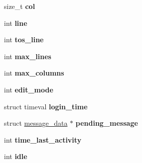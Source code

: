 \begin{DoxyCompactItemize}
\item 
\hypertarget{structdescriptor__data_aba74a84b3bad7387b9b5e3bf241ba015}{size\-\_\-t {\bfseries col}}\label{structdescriptor__data_aba74a84b3bad7387b9b5e3bf241ba015}

\item 
\hypertarget{structdescriptor__data_a1477839877221460a132848b7340f904}{int {\bfseries line}}\label{structdescriptor__data_a1477839877221460a132848b7340f904}

\item 
\hypertarget{structdescriptor__data_a5236d67527a8b6f1cf5fabb0760e3b20}{int {\bfseries tos\-\_\-line}}\label{structdescriptor__data_a5236d67527a8b6f1cf5fabb0760e3b20}

\item 
\hypertarget{structdescriptor__data_a12bdc9635fd09ce0906a28ad30a73e4d}{int {\bfseries max\-\_\-lines}}\label{structdescriptor__data_a12bdc9635fd09ce0906a28ad30a73e4d}

\item 
\hypertarget{structdescriptor__data_abe7ec1bc4431feea1e82b57a4ba7d73a}{int {\bfseries max\-\_\-columns}}\label{structdescriptor__data_abe7ec1bc4431feea1e82b57a4ba7d73a}

\item 
\hypertarget{structdescriptor__data_ac1375013e49baf64fd248f5b23f37c8a}{int {\bfseries edit\-\_\-mode}}\label{structdescriptor__data_ac1375013e49baf64fd248f5b23f37c8a}

\item 
\hypertarget{structdescriptor__data_a3dddb74c4d4bc188ad4994a4e8027d31}{struct timeval {\bfseries login\-\_\-time}}\label{structdescriptor__data_a3dddb74c4d4bc188ad4994a4e8027d31}

\item 
\hypertarget{structdescriptor__data_a8de6ed1bad23a2b053cd6c81e6e2d1aa}{struct \hyperlink{structmessage__data}{message\-\_\-data} $\ast$ {\bfseries pending\-\_\-message}}\label{structdescriptor__data_a8de6ed1bad23a2b053cd6c81e6e2d1aa}

\item 
\hypertarget{structdescriptor__data_a8bea3958920a5f23b527e10cc685b621}{int {\bfseries time\-\_\-last\-\_\-activity}}\label{structdescriptor__data_a8bea3958920a5f23b527e10cc685b621}

\item 
\hypertarget{structdescriptor__data_a7971ed70eebcdfda90f3233a3352a26f}{int {\bfseries idle}}\label{structdescriptor__data_a7971ed70eebcdfda90f3233a3352a26f}


\end{DoxyCompactItemize}
